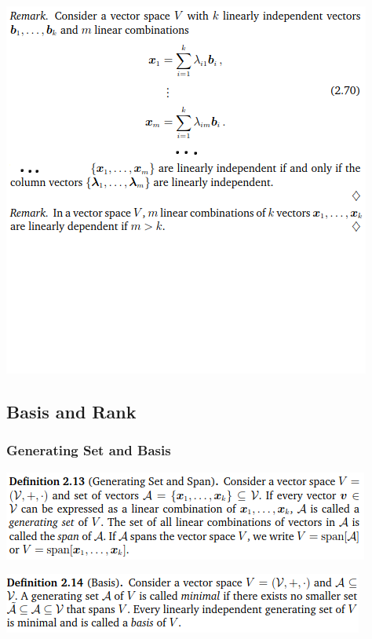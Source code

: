 \documentclass[oneside,10pt]{scrartcl}
\begin{document}
\begin{multicols*}{2}
\includegraphics[width=\linewidth]{2.5_2}


\subsection{Basis and Rank}

\subsubsection*{Generating Set and Basis}
\includegraphics[width=\linewidth]{2.6}

\includegraphics[width=\linewidth]{2.6_1}


\end{multicols*}
\end{document}
